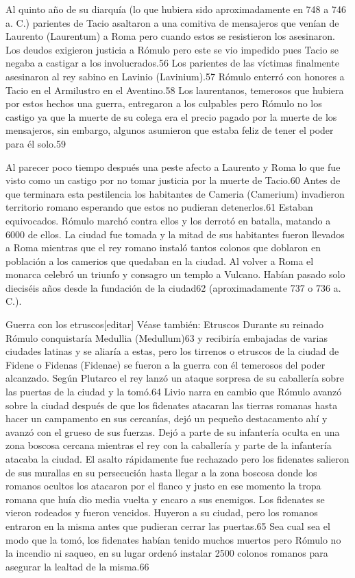 \documentclass[11pt,a4paper]{book}
\begin{document}
	\bigskip
							Al quinto año de su diarquía (lo que hubiera sido aproximadamente en 748 a 746 a. C.) parientes de Tacio asaltaron a una comitiva de mensajeros que venían de Laurento (Laurentum) a Roma pero cuando estos se resistieron los asesinaron. Los deudos exigieron justicia a Rómulo pero este se vio impedido pues Tacio se negaba a castigar a los involucrados.56 Los parientes de las víctimas finalmente asesinaron al rey sabino en Lavinio (Lavinium).57 Rómulo enterró con honores a Tacio en el Armilustro en el Aventino.58 Los laurentanos, temerosos que hubiera por estos hechos una guerra, entregaron a los culpables pero Rómulo no los castigo ya que la muerte de su colega era el precio pagado por la muerte de los mensajeros, sin embargo, algunos asumieron que estaba feliz de tener el poder para él solo.59
	\bigskip
							
	\bigskip
							Al parecer poco tiempo después una peste afecto a Laurento y Roma lo que fue visto como un castigo por no tomar justicia por la muerte de Tacio.60 Antes de que terminara esta pestilencia los habitantes de Cameria (Camerium) invadieron territorio romano esperando que estos no pudieran detenerlos.61 Estaban equivocados. Rómulo marchó contra ellos y los derrotó en batalla, matando a 6000 de ellos. La ciudad fue tomada y la mitad de sus habitantes fueron llevados a Roma mientras que el rey romano instaló tantos colonos que doblaron en población a los camerios que quedaban en la ciudad. Al volver a Roma el monarca celebró un triunfo y consagro un templo a Vulcano. Habían pasado solo dieciséis años desde la fundación de la ciudad62 (aproximadamente 737 o 736 a. C.).
	\bigskip
							
	\bigskip
							Guerra con los etruscos[editar]
	\bigskip
							Véase también: Etruscos
	\bigskip
							Durante su reinado Rómulo conquistaría Medullia (Medullum)63 y recibiría embajadas de varias ciudades latinas y se aliaría a estas, pero los tirrenos o etruscos de la ciudad de Fidene o Fidenas (Fidenae) se fueron a la guerra con él temerosos del poder alcanzado. Según Plutarco el rey lanzó un ataque sorpresa de su caballería sobre las puertas de la ciudad y la tomó.64 Livio narra en cambio que Rómulo avanzó sobre la ciudad después de que los fidenates atacaran las tierras romanas hasta hacer un campamento en sus cercanías, dejó un pequeño destacamento ahí y avanzó con el grueso de sus fuerzas. Dejó a parte de su infantería oculta en una zona boscosa cercana mientras el rey con la caballería y parte de la infantería atacaba la ciudad. El asalto rápidamente fue rechazado pero los fidenates salieron de sus murallas en su persecución hasta llegar a la zona boscosa donde los romanos ocultos los atacaron por el flanco y justo en ese momento la tropa romana que huía dio media vuelta y encaro a sus enemigos. Los fidenates se vieron rodeados y fueron vencidos. Huyeron a su ciudad, pero los romanos entraron en la misma antes que pudieran cerrar las puertas.65 Sea cual sea el modo que la tomó, los fidenates habían tenido muchos muertos pero Rómulo no la incendio ni saqueo, en su lugar ordenó instalar 2500 colonos romanos para asegurar la lealtad de la misma.66
	\bigskip
							
\end{document}
